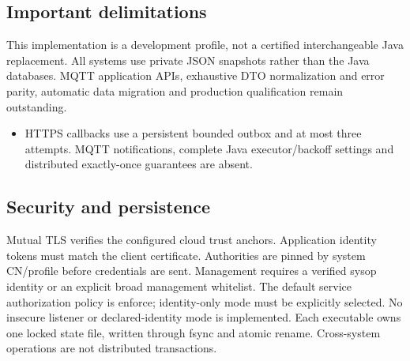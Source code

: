 \documentclass[a4paper]{arrowhead}
\begin{document}
\subsection{Important delimitations}
This implementation is a development profile, not a certified interchangeable Java replacement. All systems use private JSON snapshots rather than the Java databases. MQTT application APIs, exhaustive DTO normalization and error parity, automatic data migration and production qualification remain outstanding.
\begin{itemize}
\item HTTPS callbacks use a persistent bounded outbox and at most three attempts. MQTT notifications, complete Java executor/backoff settings and distributed exactly-once guarantees are absent.
\end{itemize}
\subsection{Security and persistence}
Mutual TLS verifies the configured cloud trust anchors. Application identity tokens must match the client certificate. Authorities are pinned by system CN/profile before credentials are sent. Management requires a verified sysop identity or an explicit broad management whitelist. The default service authorization policy is enforce; identity-only mode must be explicitly selected. No insecure listener or declared-identity mode is implemented. Each executable owns one locked state file, written through fsync and atomic rename. Cross-system operations are not distributed transactions.
\clearpage
\end{document}
